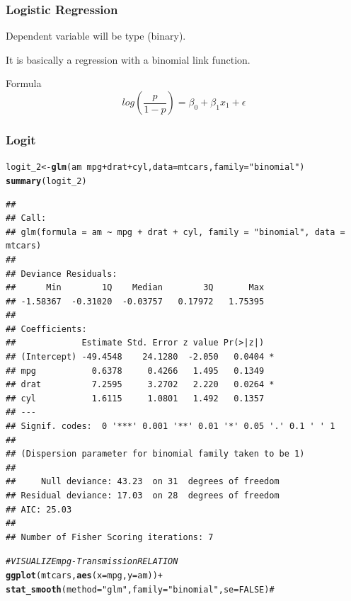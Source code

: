 \documentclass{beamer}\usepackage[]{graphicx}\usepackage[]{color}
\makeatletter
\newcommand{\hlnum}[1]{\textcolor[rgb]{0.686,0.059,0.569}{#1}}%
\newcommand{\hlstr}[1]{\textcolor[rgb]{0.192,0.494,0.8}{#1}}%
\newcommand{\hlcom}[1]{\textcolor[rgb]{0.678,0.584,0.686}{\textit{#1}}}%
\newcommand{\hlopt}[1]{\textcolor[rgb]{0,0,0}{#1}}%
\newcommand{\hlstd}[1]{\textcolor[rgb]{0.345,0.345,0.345}{#1}}%
\newcommand{\hlkwb}[1]{\textcolor[rgb]{0.69,0.353,0.396}{#1}}%
\newcommand{\hlkwc}[1]{\textcolor[rgb]{0.333,0.667,0.333}{#1}}%
\newcommand{\hlkwd}[1]{\textcolor[rgb]{0.737,0.353,0.396}{\textbf{#1}}}%
\newenvironment{kframe}{%
 \def\at@end@of@kframe{}%
 \ifinner\ifhmode%
  \def\at@end@of@kframe{\end{minipage}}%
  \begin{minipage}{\columnwidth}%
 \fi\fi%
 \def\FrameCommand##1{\hskip\@totalleftmargin \hskip-\fboxsep
 \colorbox{shadecolor}{##1}\hskip-\fboxsep
     \hskip-\linewidth \hskip-\@totalleftmargin \hskip\columnwidth}%
 \MakeFramed {\advance\hsize-\width
   \@totalleftmargin\z@ \linewidth\hsize
   \@setminipage}}%
 {\par\unskip\endMakeFramed%
 \at@end@of@kframe}
\newenvironment{knitrout}{}{} %
\makeatother
\begin{document}
\begin{frame}
\frametitle{Logistic Regression}

Dependent variable will be type (binary). \vfill

It is basically a regression with a binomial link function. \vfill

\begin{alertblock}{Formula}
\[
log \left(\frac{p}{1-p} \right) = \beta_0 + \beta_1 x_1 + \epsilon
\]
\end{alertblock}

\end{frame}


\begin{frame}
\frametitle{Logit}


\begin{knitrout}\tiny
{}\color{fgcolor}\begin{kframe}
\begin{alltt}
\hlstd{logit_2} \hlkwb{<-} \hlkwd{glm}\hlstd{(am} \hlopt{~} \hlstd{mpg} \hlopt{+} \hlstd{drat} \hlopt{+} \hlstd{cyl,} \hlkwc{data} \hlstd{= mtcars,} \hlkwc{family} \hlstd{=} \hlstr{"binomial"}\hlstd{)}
\hlkwd{summary}\hlstd{(logit_2)}
\end{alltt}
\begin{verbatim}
## 
## Call:
## glm(formula = am ~ mpg + drat + cyl, family = "binomial", data = mtcars)
## 
## Deviance Residuals: 
##      Min        1Q    Median        3Q       Max  
## -1.58367  -0.31020  -0.03757   0.17972   1.75395  
## 
## Coefficients:
##             Estimate Std. Error z value Pr(>|z|)  
## (Intercept) -49.4548    24.1280  -2.050   0.0404 *
## mpg           0.6378     0.4266   1.495   0.1349  
## drat          7.2595     3.2702   2.220   0.0264 *
## cyl           1.6115     1.0801   1.492   0.1357  
## ---
## Signif. codes:  0 '***' 0.001 '**' 0.01 '*' 0.05 '.' 0.1 ' ' 1
## 
## (Dispersion parameter for binomial family taken to be 1)
## 
##     Null deviance: 43.23  on 31  degrees of freedom
## Residual deviance: 17.03  on 28  degrees of freedom
## AIC: 25.03
## 
## Number of Fisher Scoring iterations: 7
\end{verbatim}
\end{kframe}
\end{knitrout}

\begin{knitrout}\scriptsize
{}\color{fgcolor}\begin{kframe}
\begin{alltt}
\hlcom{# VISUALIZE mpg - Transmission RELATION}
\hlkwd{ggplot}\hlstd{(mtcars,} \hlkwd{aes}\hlstd{(}\hlkwc{x} \hlstd{= mpg,} \hlkwc{y} \hlstd{= am))} \hlopt{+}
        \hlkwd{stat_smooth}\hlstd{(}\hlkwc{method}\hlstd{=}\hlstr{"glm"}\hlstd{,} \hlkwc{family}\hlstd{=}\hlstr{"binomial"}\hlstd{,} \hlkwc{se}\hlstd{=}\hlnum{FALSE}\hlstd{)} \hlcom{#}
\end{alltt}



\end{kframe}
\end{knitrout}
\end{frame}
\end{document}
